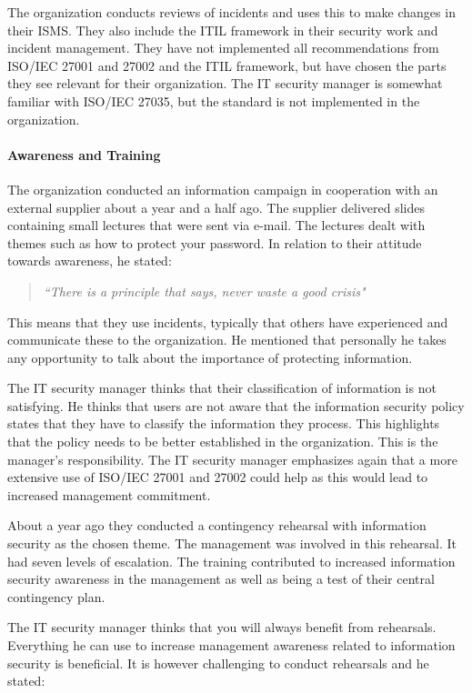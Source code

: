 The organization conducts reviews of incidents and uses this to make changes in their \ac{ISMS}. They also include the \ac{ITIL} framework in their security work and incident management. They have not implemented all recommendations from \acs{ISO}/\acs{IEC} 27001 and 27002 and the \ac{ITIL} framework, but have chosen the parts they see relevant for their organization. The IT security manager is somewhat familiar with \acs{ISO}/\acs{IEC} 27035, but the standard is not implemented in the organization.

\paragraph{Awareness and Training}
The organization conducted an information campaign in cooperation with an external supplier about a year and a half ago. The supplier delivered slides containing small lectures that were sent via e-mail. The lectures dealt with themes such as how to protect your password. In relation to their attitude towards awareness, he stated: 

\begin{quote}
\textit{``There is a principle that says, never waste a good crisis"}
\end{quote}

This means that they use incidents, typically that others have experienced and communicate these to the organization. He mentioned that personally he takes any opportunity to talk about the importance of protecting information.

The IT security manager thinks that their classification of information is not satisfying. He thinks that users are not aware that the information security policy states that they have to classify the information they process. This highlights that the policy needs to be better established in the organization. This is the manager's responsibility. The IT security manager emphasizes again that a more extensive use of \acs{ISO}/\acs{IEC} 27001 and 27002 could help as this would lead to increased management commitment.

About a year ago they conducted a contingency rehearsal with information security as the chosen theme. The management was involved in this rehearsal. It had seven levels of escalation. The training contributed to increased information security awareness in the management as well as being a test of their central contingency plan.

The IT security manager thinks that you will always benefit from rehearsals. Everything he can use to increase management awareness related to information security is beneficial. It is however challenging to conduct rehearsals and he stated:

